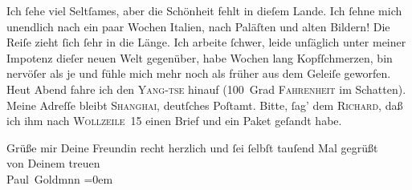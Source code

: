 \pstart
           Ich{ }ſehe viel Seltſames, aber die Schönheit fehlt in dieſem Lande. Ich{ }ſehne mich unendlich nach ein
               paar Wochen Italien, nach Paläſten und alten
               Bildern! {\pb}Die Reiſe zieht{ }ſich{ }ſehr in die Länge.
               Ich arbeite{ }ſchwer, leide unſäglich unter meiner Impotenz\strikeout{,} dieſer neuen Welt gegenüber, habe Wochen lang Kopfſchmerzen, bin nervöſer
               als je und fühle mich\strikeout{,} mehr noch als früher aus dem
               Geleiſe geworfen. Heut{ }Abend fahre ich den \textsc{Yang-tse} hinauf (100 Grad \textsc{Fahrenheit} im Schatten). Meine
               Adreſſe bleibt \textsc{Shanghai}, {\pb}deutſches Poſtamt. Bitte,{ }ſag’ dem \textsc{Richard}, daß ich ihm nach \textsc{Wollzeile} 15 einen Brief und ein Paket geſandt
               habe.\pend
           
\pstart
            Grüße mir Deine Freundin recht herzlich und{ }ſei{ }ſelbſt tauſend Mal gegrüßt {\\[\baselineskip]}von Deinem treuen{\\[\baselineskip]}\spacefill\mbox{Paul Goldmnn}\pend
           \leftskip=0em{}\endnumbering{}  \newcommand{\dateiname}{L02848}\newcommand{\titel}{Paul Goldmann an Arthur Schnitzler, 26. 6. [1898]}\newcommand{\editorInnen}{Martin Anton Müller und Laura Untner}

